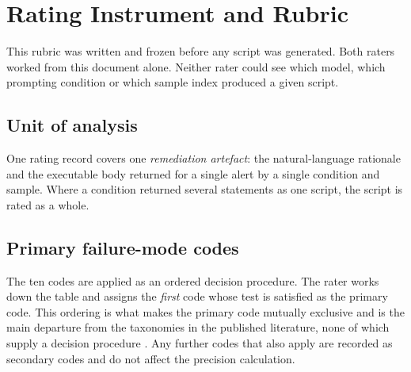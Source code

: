 \section{Rating Instrument and Rubric}
\label{app:rubric}

This rubric was written and frozen before any script was generated. Both raters
worked from this document alone. Neither rater could see which model, which
prompting condition or which sample index produced a given script.

\subsection{Unit of analysis}

One rating record covers one \emph{remediation artefact}: the natural-language
rationale and the executable body returned for a single alert by a single condition
and sample. Where a condition returned several statements as one script, the script
is rated as a whole.

\subsection{Primary failure-mode codes}
\label{app:rubric:codes}

The ten codes are applied as an ordered decision procedure. The rater works down the
table and assigns the \emph{first} code whose test is satisfied as the primary code.
This ordering is what makes the primary code mutually exclusive and is the main
departure from the taxonomies in the published literature, none of which supply a
decision procedure \citep{sood2025hallucinationparadigm,massenon2025myaiislying}. Any
further codes that also apply are recorded as secondary codes and do not affect the
precision calculation.

